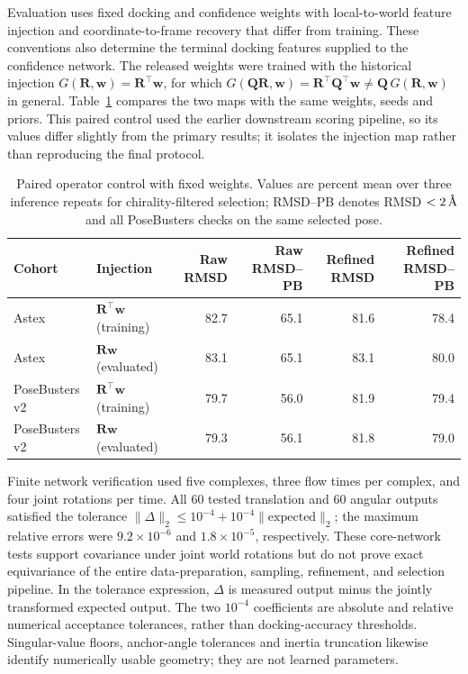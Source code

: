 \documentclass{article}
\newcommand{\angstrom}{\text{\normalfont\AA}}
\begin{document}
Evaluation uses fixed docking and confidence weights with local-to-world feature injection and coordinate-to-frame recovery that differ from training. These conventions also determine the terminal docking features supplied to the confidence network.
The released weights were trained with the historical injection \(G(\mathbf R,\mathbf w)=\mathbf R^\top\mathbf w\), for which \(G(\mathbf Q\mathbf R,\mathbf w)=\mathbf R^\top\mathbf Q^\top\mathbf w\neq\mathbf Q\,G(\mathbf R,\mathbf w)\) in general. Table~\ref{tab:si_operator_control} compares the two maps with the same weights, seeds and priors. This paired control used the earlier downstream scoring pipeline, so its values differ slightly from the primary results; it isolates the injection map rather than reproducing the final protocol.

\begin{table}[htbp]
    \centering
    \footnotesize\setlength{\tabcolsep}{4pt}
    \caption{Paired operator control with fixed weights. Values are percent mean over three inference repeats for chirality-filtered selection; RMSD--PB denotes RMSD \(<2\,\angstrom\) and all PoseBusters checks on the same selected pose.}
    \label{tab:si_operator_control}
    \begin{tabular}{llrrrr}
        \toprule
        Cohort & Injection & Raw RMSD & Raw RMSD--PB & Refined RMSD & Refined RMSD--PB \\
        \midrule
        Astex & \(\mathbf R^\top\mathbf w\) (training) & 82.7 & 65.1 & 81.6 & 78.4 \\
        Astex & \(\mathbf R\mathbf w\) (evaluated) & 83.1 & 65.1 & 83.1 & 80.0 \\
        PoseBusters v2 & \(\mathbf R^\top\mathbf w\) (training) & 79.7 & 56.0 & 81.9 & 79.4 \\
        PoseBusters v2 & \(\mathbf R\mathbf w\) (evaluated) & 79.3 & 56.1 & 81.8 & 79.0 \\
        \bottomrule
    \end{tabular}
\end{table}

Finite network verification used five complexes, three flow times per complex, and four joint rotations per time.
All 60 tested translation and 60 angular outputs satisfied the tolerance \(\|\Delta\|_2\le10^{-4}+10^{-4}\|\text{expected}\|_2\); the maximum relative errors were \(9.2\times10^{-6}\) and \(1.8\times10^{-5}\), respectively.
These core-network tests support covariance under joint world rotations but do not prove exact equivariance of the entire data-preparation, sampling, refinement, and selection pipeline.
In the tolerance expression, \(\Delta\) is measured output minus the jointly transformed expected output. The two \(10^{-4}\) coefficients are absolute and relative numerical acceptance tolerances, rather than docking-accuracy thresholds. Singular-value floors, anchor-angle tolerances and inertia truncation likewise identify numerically usable geometry; they are not learned parameters.
\end{document}
